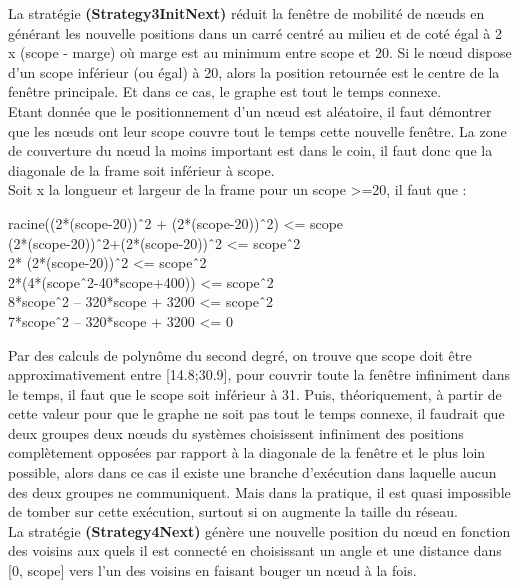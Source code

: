 \documentclass[10pt]{report}
\begin{document}
La stratégie \textbf{(Strategy3InitNext)} réduit la fenêtre de mobilité de nœuds en générant les nouvelle positions dans un carré centré au milieu et de coté égal à 2 x (scope - marge) où marge est au minimum entre scope et 20.
Si le nœud dispose d’un scope inférieur (ou égal) à 20, alors la position retournée est le centre de la fenêtre principale. Et dans ce cas, le graphe est tout le temps connexe.\\
Etant donnée que le positionnement d’un nœud est aléatoire, il faut démontrer que les nœuds ont leur scope couvre tout le temps cette nouvelle fenêtre.
La zone de couverture du nœud la moins important est dans le coin, il faut donc que la diagonale de la frame soit inférieur à scope.\\
Soit x la longueur et largeur de la frame pour un scope >=20, il faut que :
\begin{center}
racine((2*(scope-20))ˆ2 + (2*(scope-20))ˆ2) <= scope\\
(2*(scope-20))ˆ2+(2*(scope-20))ˆ2 <= scopeˆ2\\
2* (2*(scope-20))ˆ2 <= scopeˆ2\\
2*(4*(scopeˆ2-40*scope+400)) <= scopeˆ2\\
8*scopeˆ2 – 320*scope + 3200 <= scopeˆ2\\
7*scopeˆ2 – 320*scope + 3200 <= 0\\
\end{center}

Par des calculs de polynôme du second degré, on trouve que scope doit être approximativement entre [14.8;30.9], pour couvrir toute la fenêtre infiniment dans le temps, il faut que le scope soit inférieur à 31. Puis, théoriquement, à partir de cette valeur pour que le graphe ne soit pas tout le temps connexe, il faudrait que deux groupes deux nœuds du systèmes choisissent infiniment des positions complètement opposées par rapport à la diagonale de la fenêtre et le plus loin possible, alors dans ce cas il existe une branche d’exécution dans laquelle aucun des deux groupes ne communiquent.
Mais dans la pratique, il est quasi impossible de tomber sur cette exécution, surtout si on augmente la taille du réseau.\\

La stratégie \textbf{(Strategy4Next)} génère une nouvelle position du nœud en fonction des voisins aux quels il est connecté en choisissant un angle et une distance dans [0, scope] vers l'un des voisins en faisant bouger un nœud à la fois.\\
\end{document}
